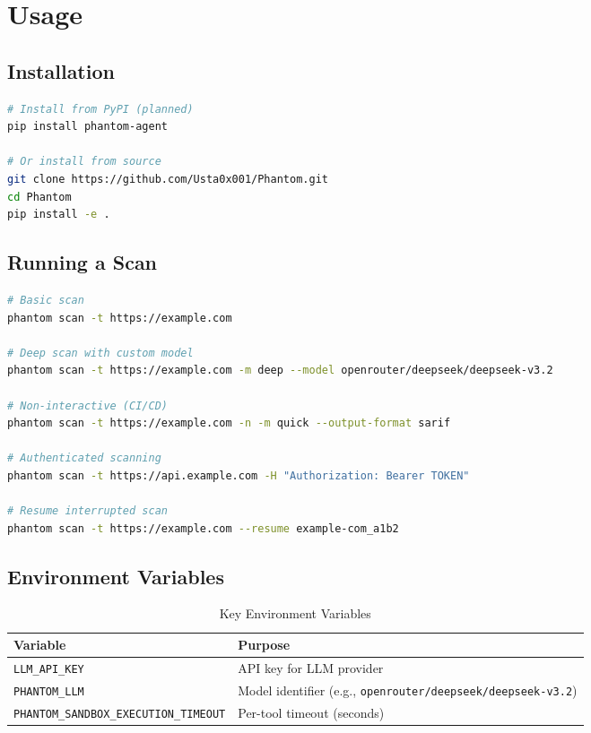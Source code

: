 \documentclass[12pt,a4paper]{article}
\begin{document}
\section{Usage}

\subsection{Installation}

\begin{lstlisting}[language=bash]
# Install from PyPI (planned)
pip install phantom-agent

# Or install from source
git clone https://github.com/Usta0x001/Phantom.git
cd Phantom
pip install -e .
\end{lstlisting}

\subsection{Running a Scan}

\begin{lstlisting}[language=bash]
# Basic scan
phantom scan -t https://example.com

# Deep scan with custom model
phantom scan -t https://example.com -m deep --model openrouter/deepseek/deepseek-v3.2

# Non-interactive (CI/CD)
phantom scan -t https://example.com -n -m quick --output-format sarif

# Authenticated scanning
phantom scan -t https://api.example.com -H "Authorization: Bearer TOKEN"

# Resume interrupted scan
phantom scan -t https://example.com --resume example-com_a1b2
\end{lstlisting}

\subsection{Environment Variables}

\begin{table}[H]
\centering
\begin{tabular}{ll}
\toprule
\textbf{Variable} & \textbf{Purpose} \\
\midrule
\texttt{LLM\_API\_KEY}   & API key for LLM provider \\
\texttt{PHANTOM\_LLM}    & Model identifier (e.g., \texttt{openrouter/deepseek/deepseek-v3.2}) \\
\texttt{PHANTOM\_SANDBOX\_EXECUTION\_TIMEOUT} & Per-tool timeout (seconds) \\
\bottomrule
\end{tabular}
\caption{Key Environment Variables}
\end{table}
\end{document}
